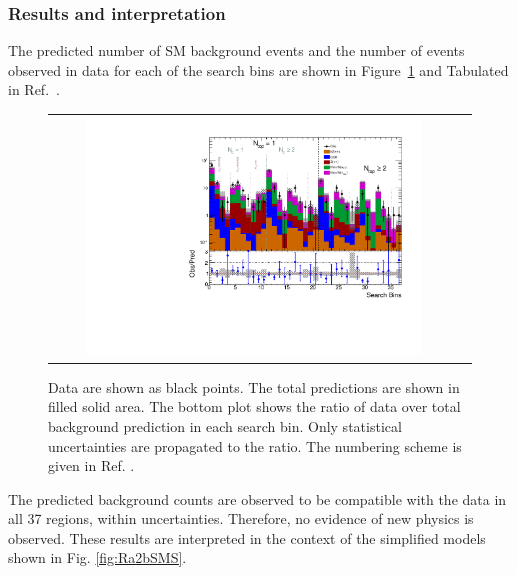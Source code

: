 \subsubsection{Results and interpretation}
The predicted number of SM background events and the number of events observed in data for each of the search bins are shown in Figure~\ref{fig:baseline_SR} and Tabulated in Ref.~\cite{CMS:2016nhb}. 
\begin{figure}[htbp]
  \begin{center}
  \begin{tabular}{cc}
\hspace{-1.5cm}
  \includegraphics[width=0.85\textwidth]{figures/SusySearches/HadStop2015/UnblindPlots.pdf}
  \end{tabular}
  \caption{Data are shown as black points. The total predictions are shown in filled solid area. The bottom plot shows the ratio of data over total background prediction in each search bin. Only statistical uncertainties are propagated to the ratio. The numbering scheme is given in Ref. \cite{CMS:2016nhb}.}
    \label{fig:baseline_SR}
  \end{center}
\end{figure}
The predicted background counts are observed to be compatible with the data in all 37 regions, within uncertainties. Therefore, no evidence of new physics is observed.
These results are interpreted in the context of the simplified models shown in Fig. \ref{fig:Ra2bSMS}.


